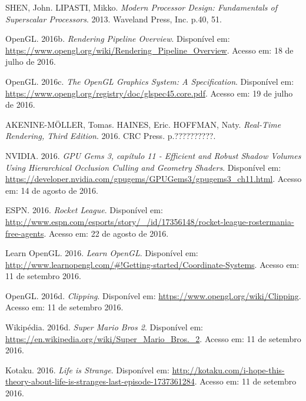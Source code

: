 \documentclass[brazil,ruledheader]{abntifes}
\begin{document}
\begin{thebibliography}{1}
SHEN, John. LIPASTI, Mikko. \textit{Modern Processor Design: Fundamentals of Superscalar Processors}. 2013. Waveland Press, Inc. p.40, 51.

OpenGL. 2016b. \textit{Rendering Pipeline Overview}. Disponível em: \url{https://www.opengl.org/wiki/Rendering_Pipeline_Overview}.
Acesso em: 18 de julho de 2016.

OpenGL. 2016c. \textit{The OpenGL Graphics System:
A Specification}. Disponível em: \url{https://www.opengl.org/registry/doc/glspec45.core.pdf}.
Acesso em: 19 de julho de 2016.

AKENINE-MÖLLER, Tomas. HAINES, Eric. HOFFMAN, Naty. \textit{Real-Time Rendering, Third Edition}. 2016. CRC Press. p.??????????.

NVIDIA. 2016. \textit{GPU Gems 3, capítulo 11 - Efficient and Robust Shadow Volumes Using Hierarchical Occlusion Culling and Geometry Shaders}. Disponível em: \url{https://developer.nvidia.com/gpugems/GPUGems3/gpugems3_ch11.html}.
Acesso em: 14 de agosto de 2016.

ESPN. 2016. \textit{Rocket League}. Disponível em: \url{http://www.espn.com/esports/story/_/id/17356148/rocket-league-rostermania-free-agents}.
Acesso em: 22 de agosto de 2016.

Learn OpenGL. 2016. \textit{Learn OpenGL}. Disponível em: \url{http://www.learnopengl.com/#!Getting-started/Coordinate-Systems}.
Acesso em: 11 de setembro 2016.

OpenGL. 2016d. \textit{Clipping}. Disponível em: \url{https://www.opengl.org/wiki/Clipping}.
Acesso em: 11 de setembro 2016.

Wikipédia. 2016d. \textit{Super Mario Bros 2}. Disponível em: \url{https://en.wikipedia.org/wiki/Super_Mario_Bros._2}.
Acesso em: 11 de setembro 2016.

Kotaku. 2016. \textit{Life is Strange}. Disponível em: \url{http://kotaku.com/i-hope-this-theory-about-life-is-stranges-last-episode-1737361284}.
Acesso em: 11 de setembro 2016.

\end{thebibliography}


\anexo
\end{document}
